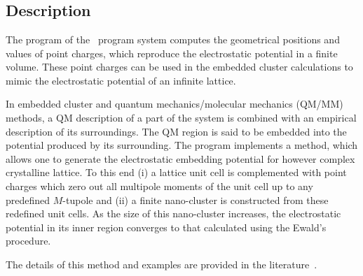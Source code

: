 
\section{}
\label{UG:sec:embq}

\subsection{Description}
\label{UG:sec:embq_description}
The  program of the \molcas\ program system computes the geometrical positions and values of point charges, which reproduce the electrostatic potential in a finite volume. These point charges can be used in the embedded cluster calculations to mimic the electrostatic potential of an infinite lattice.

In embedded cluster and quantum mechanics/molecular mechanics (QM/MM) methods, a QM description of a part of the system is combined with an empirical description of its surroundings. The QM region is said to be embedded into the potential produced by its surrounding. The  program implements a method, which allows one to generate the electrostatic embedding potential for however complex crystalline lattice. To this end (i) a lattice unit cell is complemented with point charges which zero out all multipole moments of the unit cell up to any predefined $M$-tupole and (ii) a finite nano-cluster is constructed from these redefined unit cells. As the size of this nano-cluster increases, the electrostatic potential in its inner region converges to that calculated using the Ewald's procedure.

The details of this method and examples are provided in the literature~\cite{Abarenkov:07,Sushko:10}.

